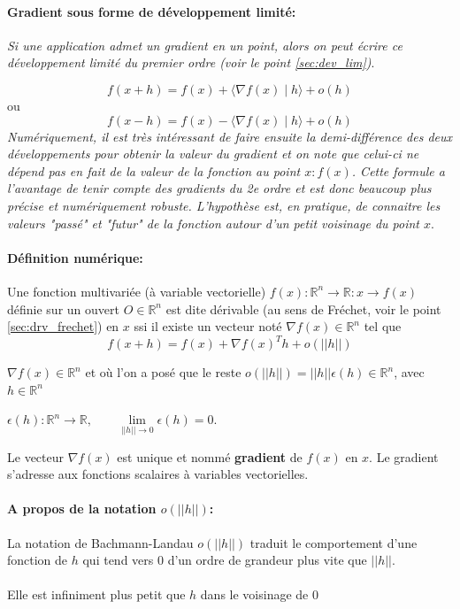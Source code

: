 		\paragraph*{Gradient sous forme de développement limité:}
		\textit{Si une application admet un gradient en un point, alors on peut écrire ce développement limité du premier ordre (voir le point \ref{sec:dev_lim})}.
		
		$${ 
			f(x+h)=f(x)+\langle \nabla f(x)\mid h\rangle +o(h) 
		}$$ 
		ou 
		$$ {  
			f(x-h)=f(x)-\langle \nabla f(x)\mid h\rangle +o(h)
		}$$
		\textit{Numériquement, il est très intéressant de faire ensuite la demi-différence des deux développements pour obtenir la valeur du gradient et on note que celui-ci ne dépend pas en fait de la valeur de la fonction au point $x : f (x)$. Cette formule a l'avantage de tenir compte des gradients du 2e ordre et est donc beaucoup plus précise et numériquement robuste. L'hypothèse est, en pratique, de connaitre les valeurs "passé" et "futur" de la fonction autour d'un petit voisinage du point $x$}.\\
		\paragraph*{Définition numérique:}
		Une fonction multivariée (à variable vectorielle)
		$ f(x)	: \mathbb{R}^n \rightarrow \mathbb{R} : x \rightarrow f(x) $ définie sur un ouvert $O \in \mathbb{R}^n$ est dite dérivable (au sens de Fréchet, voir le point \ref{sec:drv_frechet}) en $x$ ssi il existe un vecteur noté $\nabla f(x) \in \mathbb{R}^n$ tel que
		\begin{equation}
			f(x+h) = f(x) + \nabla f(x)^{T}h + o(||h||)
		\end{equation}
		
		$\nabla f(x) \in \mathbb{R}^n$ et où l’on a posé que le reste $o(||h||) = ||h||\epsilon (h) \in \mathbb{R}^n$, avec $h \in \mathbb{R}^n$ 
		\begin{center}
			$\epsilon (h): \mathbb{R}^n\rightarrow \mathbb{R}, \qquad \lim\limits_{||h|| \rightarrow 0} \epsilon(h)=0$.
		\end{center} 
		Le vecteur $\nabla f(x)$ est unique et nommé \textbf{gradient} de $f(x)$ en $x$.
		Le gradient s’adresse aux fonctions scalaires à variables vectorielles.
		\paragraph*{A propos de la notation \textbf{$o(||h||)$}:}
		La notation de Bachmann-Landau $o(||h||)$ traduit le comportement d’une fonction de $h$ qui tend vers $0$ d’un ordre de grandeur plus vite que $||h||$.\\\\
		Elle est infiniment plus petit que $h$ dans le voisinage de $0$
		
